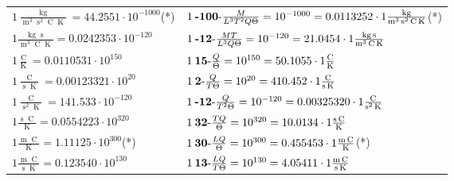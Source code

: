 \begin{center}
\begin{longtable}{l l}
{\color{black}$1 \bm{\mathrm{ }}\frac{\operatorname{kg}}{\operatorname{m}^3\operatorname{s}^2\operatorname{C}\operatorname{K}} = 44.2551\cdot10^{-1000} $}\quad(*)&
	{\color{black}$1\:\text{\textbf{-100}-} \frac{M}{L^3T^2Q\Theta}=10^{-1000} = 0.0113252 \cdot 1 \bm{\mathrm{ }}\frac{\operatorname{kg}}{\operatorname{m}^3\operatorname{s}^2\operatorname{C}\operatorname{K}}$}\quad(*)\\
{\color{black}$1 \bm{\mathrm{ }}\frac{\operatorname{kg}\operatorname{s}}{\operatorname{m}^3\operatorname{C}\operatorname{K}} = 0.0242353\cdot10^{-120} $}&
	{\color{black}$1\:\text{\textbf{-12}-} \frac{MT}{L^3Q\Theta}=10^{-120} = 21.0454 \cdot 1 \bm{\mathrm{ }}\frac{\operatorname{kg}\operatorname{s}}{\operatorname{m}^3\operatorname{C}\operatorname{K}}$}\\
\hline{\color{black}$1 \bm{\mathrm{ }}\frac{\operatorname{C}}{\operatorname{K}} = 0.0110531\cdot10^{150} $}&
	{\color{black}$1\:\text{\textbf{15}-} \frac{Q}{\Theta}=10^{150} = 50.1055 \cdot 1 \bm{\mathrm{ }}\frac{\operatorname{C}}{\operatorname{K}}$}\\
{\color{black}$1 \bm{\mathrm{ }}\frac{\operatorname{C}}{\operatorname{s}\operatorname{K}} = 0.00123321\cdot10^{20} $}&
	{\color{black}$1\:\text{\textbf{2}-} \frac{Q}{T\Theta}=10^{20} = 410.452 \cdot 1 \bm{\mathrm{ }}\frac{\operatorname{C}}{\operatorname{s}\operatorname{K}}$}\\
{\color{black}$1 \bm{\mathrm{ }}\frac{\operatorname{C}}{\operatorname{s}^2\operatorname{K}} = 141.533\cdot10^{-120} $}&
	{\color{black}$1\:\text{\textbf{-12}-} \frac{Q}{T^2\Theta}=10^{-120} = 0.00325320 \cdot 1 \bm{\mathrm{ }}\frac{\operatorname{C}}{\operatorname{s}^2\operatorname{K}}$}\\
{\color{black}$1 \bm{\mathrm{ }}\frac{\operatorname{s}\operatorname{C}}{\operatorname{K}} = 0.0554223\cdot10^{320} $}&
	{\color{black}$1\:\text{\textbf{32}-} \frac{TQ}{\Theta}=10^{320} = 10.0134 \cdot 1 \bm{\mathrm{ }}\frac{\operatorname{s}\operatorname{C}}{\operatorname{K}}$}\\
{\color{black}$1 \bm{\mathrm{ }}\frac{\operatorname{m}\operatorname{C}}{\operatorname{K}} = 1.11125\cdot10^{300} $}\quad(*)&
	{\color{black}$1\:\text{\textbf{30}-} \frac{LQ}{\Theta}=10^{300} = 0.455453 \cdot 1 \bm{\mathrm{ }}\frac{\operatorname{m}\operatorname{C}}{\operatorname{K}}$}\quad(*)\\
{\color{black}$1 \bm{\mathrm{ }}\frac{\operatorname{m}\operatorname{C}}{\operatorname{s}\operatorname{K}} = 0.123540\cdot10^{130} $}&
	{\color{black}$1\:\text{\textbf{13}-} \frac{LQ}{T\Theta}=10^{130} = 4.05411 \cdot 1 \bm{\mathrm{ }}\frac{\operatorname{m}\operatorname{C}}{\operatorname{s}\operatorname{K}}$}\\

\end{longtable}
\end{center}
